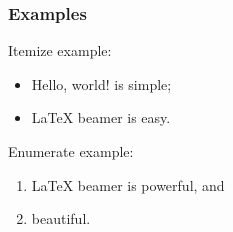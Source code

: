 \documentclass{beamer}
\begin{document}
 \begin{frame}\frametitle{Examples}
   Itemize example: \pause
   \begin{itemize}
   \item Hello, world! is simple;  \pause
   \item \LaTeX{} beamer is easy. \pause
   \end{itemize}
   Enumerate example: \pause
   \begin{enumerate}
   \item \LaTeX{} beamer is powerful, and \pause
   \item beautiful. \pause
   \end{enumerate}
 \end{frame}
\end{document}
